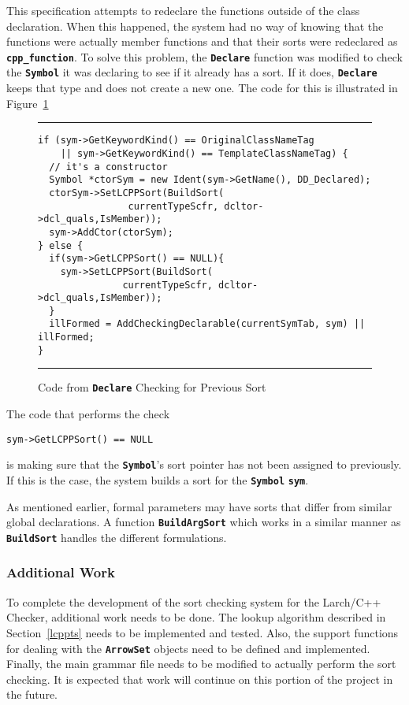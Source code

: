 \documentclass[12pt]{article} %
\newcommand{\reserved}[1]{\textbf{\texttt{#1}}} %
\newcommand{\UNSPACEFORBOX}{\vspace{-2ex}}
\newcommand{\HLINE}{\UNSPACEFORBOX%
\begin{flushleft}\rule{\textwidth}{0.01in}\end{flushleft}%
\UNSPACEFORBOX}
\newenvironment{BFIGURE}{

\begin{figure}
\small
\HLINE
}{
\HLINE
\normalsize
\end{figure}
}
\begin{document}
This specification attempts to redeclare the functions outside of the
class declaration. When this happened, the system had no way of
knowing that the functions were actually member functions and that their sorts
were redeclared as \reserved{cpp\_function}. To solve this problem,
the \reserved{Declare} function was modified to check the \reserved{Symbol} it
was declaring to see if it already has a sort. If it does,
\reserved{Declare} keeps that type and does not create a new one. The
code for this is illustrated in Figure~\ref{declarecode}

\begin{BFIGURE}
\begin{verbatim}
if (sym->GetKeywordKind() == OriginalClassNameTag
    || sym->GetKeywordKind() == TemplateClassNameTag) {
  // it's a constructor
  Symbol *ctorSym = new Ident(sym->GetName(), DD_Declared);
  ctorSym->SetLCPPSort(BuildSort(
                currentTypeScfr, dcltor->dcl_quals,IsMember));
  sym->AddCtor(ctorSym);
} else {
  if(sym->GetLCPPSort() == NULL){
    sym->SetLCPPSort(BuildSort(
               currentTypeScfr, dcltor->dcl_quals,IsMember));
  }
  illFormed = AddCheckingDeclarable(currentSymTab, sym) || illFormed;
}
\end{verbatim}
\caption{Code from \reserved{Declare} Checking for Previous Sort}
\label{declarecode}
\end{BFIGURE} 
The code that performs the check
\begin{verbatim}
sym->GetLCPPSort() == NULL
\end{verbatim}
is making sure that the \reserved{Symbol}'s sort pointer has not
been assigned to previously. If this is the case, the system builds a
sort for the \reserved{Symbol} \reserved{sym}.

As mentioned earlier, formal parameters may have sorts that differ from
similar global declarations. A function \reserved{BuildArgSort} which
works in a similar manner as \reserved{BuildSort} handles the
different formulations.

\subsubsection{Additional Work}

To complete the development of the sort checking system for the
Larch/C++ Checker, additional work needs to be done. The lookup
algorithm described in Section~\ref{lcppts} needs to be implemented
and tested. Also, the support functions for dealing with the
\reserved{ArrowSet} objects need to be defined and
implemented. Finally, the main grammar file needs to be modified to
actually perform the sort checking. It is expected that work will
continue on this portion of the project in the future.
\end{document}
